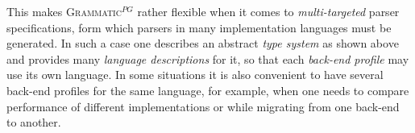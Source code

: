 \documentclass{llncs2e/llncs}
\newcommand{\ATF}{\textsc{Grammatic}$^{PG}$}
\begin{document}
This makes \ATF{} rather flexible when it comes to \emph{multi-targeted} parser specifications, form which parsers in many implementation languages must be generated. 
In such a case one describes an abstract \emph{type system} as shown above and provides many \emph{language descriptions} for it, so that each \emph{back-end profile} may use its own language. In some situations it is also convenient to have several back-end profiles for the same language, for example, when one needs to compare performance of different implementations or while migrating from one back-end to another.

\end{document}
